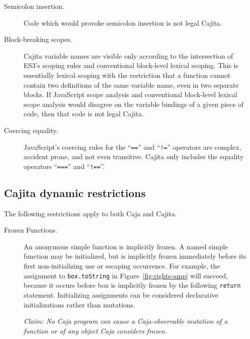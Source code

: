 \documentclass[letterpaper,twocolumn,10pt]{article}
\newcommand{\code}[1]{{\tt {#1}}}              %
\begin{document}
\begin{description}
    \item[Semicolon insertion.] Code which would provoke semicolon insertion 
    is not legal Cajita.
    
    \item[Block-breaking scopes.] Cajita variable names are visible only 
    according to the intersection of ES3's scoping rules and conventional 
    block-level lexical scoping. This is essentially lexical scoping with the 
    restriction that a function cannot contain two definitions of the same 
    variable name, even in two separate blocks. If JavaScript scope analysis 
    and conventional block-level lexical scope analysis would disagree on the 
    variable bindings of a given piece of code, then that code is not legal 
    Cajita.
    
    \item[Coercing equality.] JavaScript's coercing rules for the 
    ``\code{==}'' and ``\code{!=}'' operators are complex, accident prone, 
    and not even transitive. Cajita only includes the equality operators 
    ``\code{===}'' and ``\code{!==}''.
        
\end{description}


\subsection{Cajita dynamic restrictions}

The following restrictions apply to both Caja and Cajita.

\begin{description}

  \item[Frozen Functions.] An anonymous simple function is implicitly frozen. 
  A named simple function may be initialized, but is implicitly frozen 
  immediately before its first non-initializing use or escaping occurrence. 
  For example, the assignment to \code{box.toString} in 
  Figure~\ref{fig:rights-amp} will succeed, because it occurs before box is 
  implicitly frozen by the following \code{return} statement. Initializing 
  assignments can be considered declarative initializations rather than 
  mutations.
  
  \emph{Claim: No Caja program can cause a Caja-observable mutation of a 
  function or of any object Caja considers frozen.}
  
\end{description}
\end{document}
